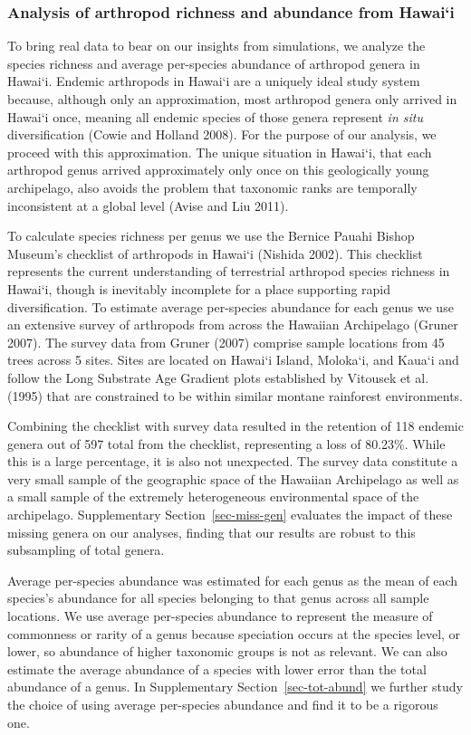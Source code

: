 \documentclass[
  letterpaper,
  DIV=11,
  numbers=noendperiod]{scrartcl}
\newcommand{\ssec}[1]{Supplementary Section~\ref{#1}}
\begin{document}
\subsubsection{Analysis of arthropod richness and abundance from
Hawai`i}\label{analysis-of-arthropod-richness-and-abundance-from-hawaii}

To bring real data to bear on our insights from simulations, we analyze
the species richness and average per-species abundance of arthropod
genera in Hawai`i. Endemic arthropods in Hawai`i are a uniquely ideal
study system because, although only an approximation, most arthropod
genera only arrived in Hawai`i once, meaning all endemic species of
those genera represent \emph{in situ} diversification (Cowie and Holland
2008). For the purpose of our analysis, we proceed with this
approximation. The unique situation in Hawai`i, that each arthropod
genus arrived approximately only once on this geologically young
archipelago, also avoids the problem that taxonomic ranks are temporally
inconsistent at a global level (Avise and Liu 2011).

To calculate species richness per genus we use the Bernice Pauahi Bishop
Museum's checklist of arthropods in Hawai`i (Nishida 2002). This
checklist represents the current understanding of terrestrial arthropod
species richness in Hawai`i, though is inevitably incomplete for a place
supporting rapid diversification. To estimate average per-species
abundance for each genus we use an extensive survey of arthropods from
across the Hawaiian Archipelago (Gruner 2007). The survey data from
Gruner (2007) comprise sample locations from 45 trees across 5 sites.
Sites are located on Hawai`i Island, Moloka`i, and Kaua`i and follow the
Long Substrate Age Gradient plots established by Vitousek et al. (1995)
that are constrained to be within similar montane rainforest
environments.

Combining the checklist with survey data resulted in the retention of
118 endemic genera out of 597 total from the checklist, representing a
loss of 80.23\%. While this is a large percentage, it is also not
unexpected. The survey data constitute a very small sample of the
geographic space of the Hawaiian Archipelago as well as a small sample
of the extremely heterogeneous environmental space of the archipelago.
\ssec{sec-miss-gen} evaluates the impact of these missing genera on our
analyses, finding that our results are robust to this subsampling of
total genera.

Average per-species abundance was estimated for each genus as the mean
of each species's abundance for all species belonging to that genus
across all sample locations. We use average per-species abundance to
represent the measure of commonness or rarity of a genus because
speciation occurs at the species level, or lower, so abundance of higher
taxonomic groups is not as relevant. We can also estimate the average
abundance of a species with lower error than the total abundance of a
genus. In \ssec{sec-tot-abund} we further study the choice of using
average per-species abundance and find it to be a rigorous one.
\end{document}

